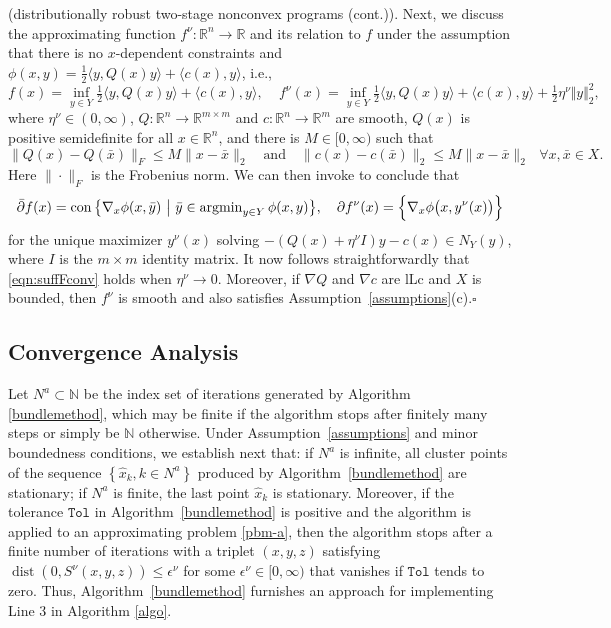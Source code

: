 \documentclass[smallextended,envcountsect]{svjour3}
\newcommand{\norm}[1]{\textstyle{\Vert} #1 \textstyle{\Vert}_2}
\newcommand{\col}[1]{\left\{#1\right\}}
\newcommand{\tol}{\texttt{Tol}}
\newcommand{\mybox}{{\hfill $\square$}}
\newcommand{\nats}{\mathbb{N}}
\newcommand{\reals}{\mathbb{R}}
\newcommand{\nargmin}{\mathop{\rm argmin}\nolimits}
\DeclareMathOperator{\con}{con}
\DeclareMathOperator{\dist}{dist}
\begin{document}
\begin{example}{\rm (distributionally robust two-stage nonconvex programs (cont.)).}
Next, we discuss the approximating function $f^\nu:\reals^n\to \reals$ and its relation to $f$ under the assumption that there is no $x$-dependent constraints and $\phi(x,y) = \tfrac{1}{2}\langle y, Q(x)y\rangle + \langle c(x), y\rangle$, i.e.,  
\[
f(x) = \inf_{y\in Y} \tfrac{1}{2}\big\langle y, Q(x)y\big\rangle + \big\langle c(x), y\big\rangle, ~~~~~f^\nu(x) = \inf_{y \in Y} \tfrac{1}{2}\big\langle y, Q(x)y\big\rangle + \big\langle c(x), y\big\rangle + \tfrac{1}{2}\eta^\nu\norm{y}^2,
\]
where $\eta^\nu\in (0,\infty)$, $Q:\reals^n\to \reals^{m\times m}$ and $c:\reals^n\to \reals^m$ are smooth, $Q(x)$ is positive semidefinite for all $x\in\reals^n$, and there is $M\in [0,\infty)$ such that 
\[
\big\|Q(x) - Q(\bar x)\big\|_F \leq M\|x- \bar x\|_2~~~ \text{ and }~~~ \big\|c(x) - c(\bar x)\big\|_2 \leq M\|x- \bar x\|_2~~~\forall x,\bar x\in X.
\] 
Here $\|\cdot\|_F$ is the Frobenius norm. We can then invoke \cite[Proposition 6.30]{Royset_Wets_2021} to conclude that 
\[
\bar \partial f(x) = \con\big\{ \nabla_x \phi(x,\bar y) ~\big|~ \bar y \in \nargmin_{y\in Y} \phi(x,y) \big\}, ~~~
\partial f^\nu(x)  = \Big\{ \nabla_x \phi\big(x,y^\nu(x)\big) \Big\}
\]
for the unique maximizer $y^\nu(x)$ solving $-(Q(x) + \eta^\nu I)y - c(x) \in N_Y(y)$, where $I$ is the $m\times m$ identity matrix. It now follows straightforwardly that \eqref{eqn:suffFconv} holds when $\eta^\nu \to 0$. Moreover, if $\nabla Q$ and $\nabla c$ are lLc and $X$ is bounded, then $f^\nu$ is smooth and also satisfies Assumption~\ref{assumptions}(c).\mybox 
\end{example}





\subsection{Convergence Analysis}
Let $N^a \subset \nats$ be the index set of iterations generated by Algorithm \ref{bundlemethod}, which may be finite if the algorithm stops after finitely many steps or simply be $\nats$ otherwise. Under Assumption~\ref{assumptions} and minor boundedness conditions, we establish next that: if $N^a$ is infinite, all cluster points of the  sequence $\col{\hat x_k, k\in N^a}$ produced by Algorithm~\ref{bundlemethod} are stationary; if $N^a$ is finite, the last point $\hat x_k$ is stationary. Moreover, if the tolerance $\tol$ in Algorithm~\ref{bundlemethod} is positive and the algorithm is applied to an approximating problem \eqref{pbm-a}, then the algorithm stops after a finite number of iterations with a triplet $(x,y,z)$ satisfying $\dist(0, S^\nu(x,y,z)) \leq \epsilon^\nu$ for some $\epsilon^\nu \in [0,\infty)$ that vanishes if $\tol$ tends to zero. Thus, Algorithm~\ref{bundlemethod} furnishes an approach for implementing Line 3 in Algorithm \ref{algo}. 
\end{document}
